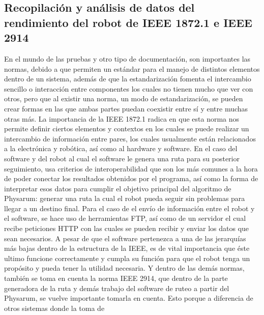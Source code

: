 \subsection{Recopilaci\'on y an\'alisis de datos del rendimiento del robot de IEEE 1872.1 e IEEE 2914}
    En el mundo de las pruebas y otro tipo de documentaci\'on,
        son importantes las normas, debido a que permiten un
        est\'andar para el manejo de distintos elementos dentro de un
        sistema, adem\'as de que la estandarizaci\'on fomenta el
        intercambio sencillo o interacci\'on entre componentes los cuales no tienen mucho que ver con otros, pero que al existir
        una norma, un modo de estandarizaci\'on, se pueden crear
        formas en las que ambas partes puedan coexistir entre s\'i y
        entre muchas otras m\'as.
    \vskip 0.5cm
    La importancia de la IEEE 1872.1 radica en que esta norma
        nos permite definir ciertos elementos y contextos en los
        cuales se puede realizar un intercambio de informaci\'on entre
        pares, los cuales usualmente est\'an relacionados a la
        electr\'onica y rob\'otica, as\'i como al hardware y software.
        En el caso del software y del robot al cual el software le
        genera una ruta para su posterior seguimiento, usa criterios
        de interoperabilidad que son los m\'as comunes a la hora de
        poder conectar los resultados obtenidos por el programa, as\'i
        como la forma de interpretar esos datos para cumplir el
        objetivo principal del algoritmo de Physarum: generar una
        ruta la cual el robot pueda seguir sin problemas para llegar a
        un destino final.
    \vskip 0.5cm
    Para el caso de el env\'io de informaci\'on entre
        el robot y el software, se hace uso de herramientas FTP, as\'i
        como de un servidor el cual recibe peticiones HTTP con las
        cuales se pueden recibir y enviar los datos que sean
        necesarios.
    \vskip 0.5cm
    A pesar de que el software pertenezca a una de las jerarqu\'ias
        m\'as bajas dentro de la estructura de la IEEE, es de vital
        importancia que \'este ultimo funcione correctamente y
        cumpla su funci\'on para que el robot tenga un prop\'osito y
        pueda tener la utilidad necesaria.
    \vskip 0.5cm
    Y dentro de las dem\'as normas, tambi\'en se toma en cuenta la
        norma IEEE 2914, que dentro de la parte generadora de la
        ruta y dem\'as trabajo del software de ruteo a partir del
        Physarum, se vuelve importante tomarla en cuenta. Esto
        porque a diferencia de otros sistemas donde la toma de
